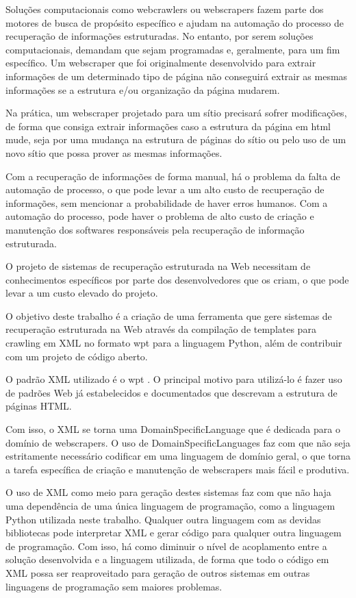 Soluções computacionais como \glspl{webcrawler} ou \glspl{webscraper} fazem parte dos motores de busca de propósito específico  e ajudam na automação do processo de recuperação de informações estruturadas. No entanto, por serem soluções computacionais, demandam que sejam programadas e, geralmente, para um fim específico. Um \gls{webscraper} que foi originalmente desenvolvido para extrair informações de um determinado tipo de página não conseguirá extrair as mesmas informações se a estrutura e/ou organização da página mudarem.

Na prática, um \gls{webscraper} projetado para um sítio precisará sofrer modificações, de forma que consiga extrair informações caso a estrutura da página em \gls{html} mude, seja por uma mudança na estrutura de páginas do sítio ou pelo uso de um novo sítio que possa prover as mesmas informações.

Com a recuperação de informações de forma manual, há o problema da falta de automação de processo, o que pode levar a um alto custo  de recuperação de informações, sem mencionar a probabilidade de haver erros humanos. Com a automação do processo, pode haver o problema de alto custo de criação e manutenção dos softwares responsáveis pela recuperação de informação estruturada.

O projeto de sistemas de recuperação estruturada na Web necessitam de conhecimentos específicos por parte dos desenvolvedores que os criam, o que pode levar a um custo elevado do projeto.

O objetivo deste trabalho é a criação de uma ferramenta que gere sistemas de recuperação estruturada na Web através da compilação de templates para \gls{crawling} em XML no formato \gls{wpt} para a linguagem Python, além de contribuir com um projeto de código aberto.

O padrão XML utilizado é o \gls{wpt} \cite{wpt}. O principal motivo para utilizá-lo é fazer uso de padrões Web já estabelecidos e documentados que descrevam a estrutura de páginas HTML.

Com isso, o XML se torna uma \gls{DomainSpecificLanguage} que é dedicada para o domínio de \glspl{webscraper}. O uso de \glspl{DomainSpecificLanguage} faz com que não seja estritamente necessário codificar em uma linguagem de domínio geral, o que torna a tarefa específica de criação e manutenção de \glspl{webscraper} mais fácil e produtiva.

O uso de XML como meio para geração destes sistemas faz com que não haja uma dependência de uma única linguagem de programação, como a linguagem Python utilizada neste trabalho. Qualquer outra linguagem com as devidas bibliotecas pode interpretar XML e gerar código para qualquer outra linguagem de programação. Com isso, há como diminuir o nível de acoplamento entre a solução desenvolvida e a linguagem utilizada, de forma que todo o código em XML possa ser reaproveitado para geração de outros sistemas em outras linguagens de programação sem maiores problemas.

